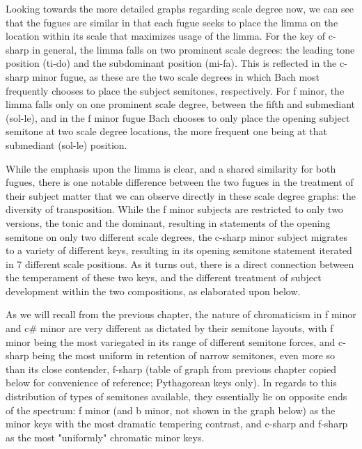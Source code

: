 Looking towards the more detailed graphs regarding scale degree now, we
can see that the fugues are similar in that each fugue seeks to place
the limma on the location within its scale that maximizes usage of the
limma. For the key of c-sharp in general, the limma falls on two
prominent scale degrees: the leading tone position (ti-do) and the
subdominant position (mi-fa). This is reflected in the c-sharp minor
fugue, as these are the two scale degrees in which Bach most frequently
chooses to place the subject semitones, respectively. For f minor, the
limma falls only on one prominent scale degree, between the fifth and
submediant (sol-le), and in the f minor fugue Bach chooses to only place
the opening subject semitone at two scale degree locations, the more
frequent one being at that submediant (sol-le) position.

While the emphasis upon the limma is clear, and a shared similarity for
both fugues, there is one notable difference between the two fugues in
the treatment of their subject matter that we can observe directly in
these scale degree graphs: the diversity of transposition. While the f
minor subjects are restricted to only two versions, the tonic and the
dominant, resulting in statements of the opening semitone on only two
different scale degrees, the c-sharp minor subject migrates to a variety
of different keys, resulting in its opening semitone statement iterated
in 7 different scale positions. As it turns out, there is a direct
connection between the temperament of these two keys, and the different
treatment of subject development within the two compositions, as
elaborated upon below.

As we will recall from the previous chapter, the nature of chromaticism
in f minor and c\# minor are very different as dictated by their
semitone layouts, with f minor being the most variegated in its range of
different semitone forces, and c-sharp being the most uniform in
retention of narrow semitones, even more so than its close contender,
f-sharp (table of graph from previous chapter copied below for
convenience of reference; Pythagorean keys only). In regards to this
distribution of types of semitones available, they essentially lie on
opposite ends of the spectrum: f minor (and b minor, not shown in the
graph below) as the minor keys with the most dramatic tempering
contrast, and c-sharp and f-sharp as the most "uniformly" chromatic
minor keys.



